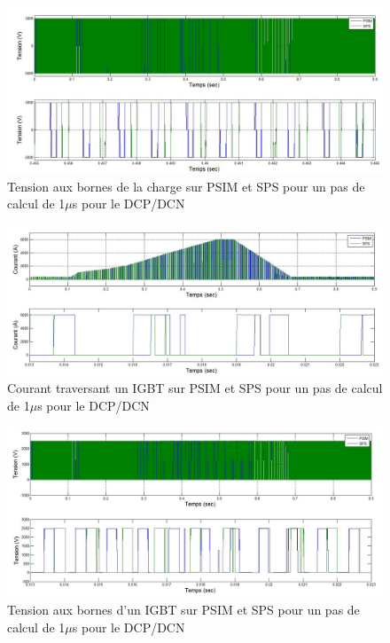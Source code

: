 \documentclass[11pt,letterpaper,final]{report}
\begin{document}
\begin{figure}[htb]
\centering
\includegraphics[scale=0.5]{Fig/DCPDCN/DCPTensionCharge1u.jpg}
\caption{Tension aux bornes de la charge sur PSIM et SPS pour un pas de calcul de 1$\mu$s pour le DCP/DCN}
\label{DC_ch_ten_1}
\end{figure}


\begin{figure}[htb]
\centering
\includegraphics[scale=0.5]{Fig/DCPDCN/DCPCourantIGBT1u.jpg}
\caption{Courant traversant un IGBT sur PSIM et SPS pour un pas de calcul de 1$\mu$s pour le DCP/DCN}
\label{DC_IG_cou_1}
\end{figure}


\begin{figure}[htb]
\centering
\includegraphics[scale=0.5]{Fig/DCPDCN/DCPTensionIGBT1u.jpg}
\caption{Tension aux bornes d'un IGBT sur PSIM et SPS pour un pas de calcul de 1$\mu$s pour le DCP/DCN}
\label{DC_IG_ten_1}
\end{figure}
\end{document}
